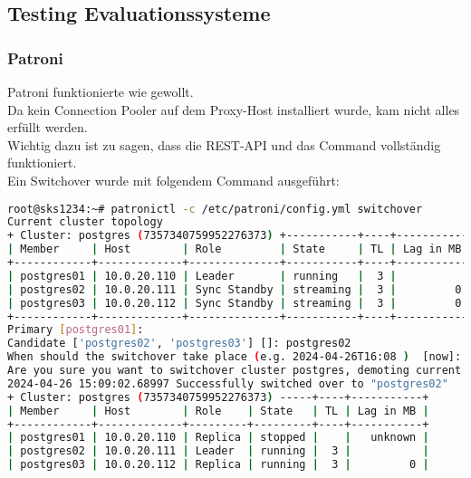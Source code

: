 
\begin{flushleft}
    \subsection{Testing Evaluationssysteme}
    \subsubsection{Patroni}
    Patroni funktionierte wie gewollt.\\
    Da kein Connection Pooler auf dem Proxy-Host installiert wurde, kam nicht alles erfüllt werden.\\
    Wichtig dazu ist zu sagen, dass die REST-API und das Command vollständig funktioniert.\\
    Ein Switchover wurde mit folgendem Command ausgeführt:
\lstset{style=gra_codestyle}
\begin{lstlisting}[language=bash, caption=Patroni - Testing - Switchover,captionpos=b,label={lst:testing_patroni_switchover},breaklines=true]
root@sks1234:~# patronictl -c /etc/patroni/config.yml switchover
Current cluster topology
+ Cluster: postgres (7357340759952276373) +-----------+----+-----------+
| Member     | Host        | Role         | State     | TL | Lag in MB |
+------------+-------------+--------------+-----------+----+-----------+
| postgres01 | 10.0.20.110 | Leader       | running   |  3 |           |
| postgres02 | 10.0.20.111 | Sync Standby | streaming |  3 |         0 |
| postgres03 | 10.0.20.112 | Sync Standby | streaming |  3 |         0 |
+------------+-------------+--------------+-----------+----+-----------+
Primary [postgres01]:
Candidate ['postgres02', 'postgres03'] []: postgres02
When should the switchover take place (e.g. 2024-04-26T16:08 )  [now]: now
Are you sure you want to switchover cluster postgres, demoting current leader postgres01? [y/N]: y
2024-04-26 15:09:02.68997 Successfully switched over to "postgres02"
+ Cluster: postgres (7357340759952276373) -----+----+-----------+
| Member     | Host        | Role    | State   | TL | Lag in MB |
+------------+-------------+---------+---------+----+-----------+
| postgres01 | 10.0.20.110 | Replica | stopped |    |   unknown |
| postgres02 | 10.0.20.111 | Leader  | running |  3 |           |
| postgres03 | 10.0.20.112 | Replica | running |  3 |         0 |

\end{lstlisting}
\end{flushleft}
